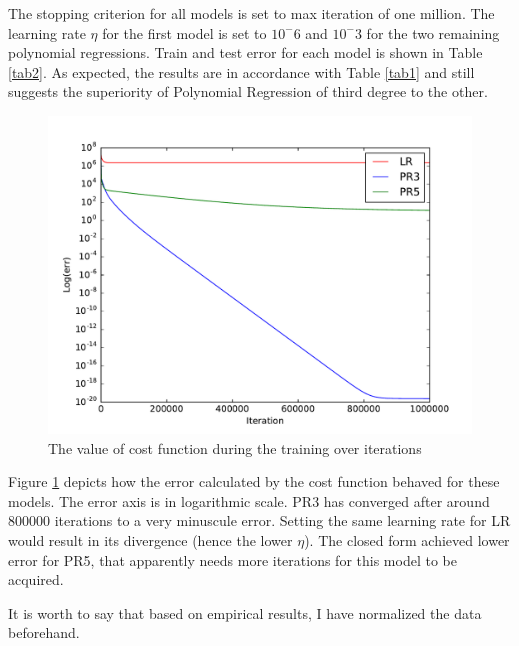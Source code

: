 \documentclass[paper=a4, fontsize=11pt]{scrartcl} %
\numberwithin{figure}{section} %
\numberwithin{table}{section} %
\begin{document}
The stopping criterion for all models is set to max iteration of one million. The learning rate $\eta$ for the first model is set to $10^-6$ and $10^-3$ for the two remaining polynomial regressions. Train and test error for each model is shown in Table \ref{tab2}. As expected, the results are in accordance with Table \ref{tab1} and still suggests the superiority of Polynomial Regression of third degree to the other.

\begin{figure}
\begin{center}
\includegraphics[width=12cm]{plot2.pdf}
\caption{The value of cost function during the training over iterations}
\label{fig2}
\end{center}
\end{figure}

Figure \ref{fig2} depicts how the error calculated by the cost function behaved for these models. The error axis is in logarithmic scale. PR3 has converged after around 800000 iterations to a very minuscule error. Setting the same learning rate for LR would result in its divergence (hence the lower $\eta$). The closed form achieved lower error for PR5, that apparently needs more iterations for this model to be acquired.

It is worth to say that based on empirical results, I have normalized the data beforehand. 
\end{document}
